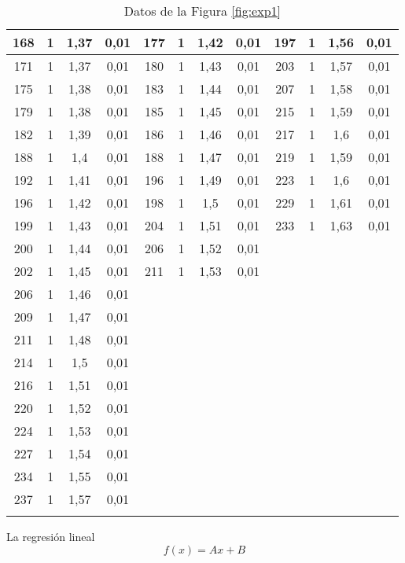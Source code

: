 \documentclass[a4paper,12pt,spanish]{article}
\begin{document}
\begin{longtable}{|*{12}{c|}}
		168 & 1 & 1,37 & 0,01 & 177 & 1 & 1,42 & 0,01 & 197 & 1 & 1,56 & 0,01 \\ \hline 
		171 & 1 & 1,37 & 0,01 & 180 & 1 & 1,43 & 0,01 & 203 & 1 & 1,57 & 0,01 \\ \hline 
		175 & 1 & 1,38 & 0,01 & 183 & 1 & 1,44 & 0,01 & 207 & 1 & 1,58 & 0,01 \\ \hline 
		179 & 1 & 1,38 & 0,01 & 185 & 1 & 1,45 & 0,01 & 215 & 1 & 1,59 & 0,01 \\ \hline 
		182 & 1 & 1,39 & 0,01 & 186 & 1 & 1,46 & 0,01 & 217 & 1 & 1,6 & 0,01 \\ \hline 
		188 & 1 & 1,4 & 0,01 & 188 & 1 & 1,47 & 0,01 & 219 & 1 & 1,59 & 0,01 \\ \hline 
		192 & 1 & 1,41 & 0,01 & 196 & 1 & 1,49 & 0,01 & 223 & 1 & 1,6 & 0,01 \\ \hline 
		196 & 1 & 1,42 & 0,01 & 198 & 1 & 1,5 & 0,01 & 229 & 1 & 1,61 & 0,01 \\ \hline 
		199 & 1 & 1,43 & 0,01 & 204 & 1 & 1,51 & 0,01 & 233 & 1 & 1,63 & 0,01 \\ \hline 
		200 & 1 & 1,44 & 0,01 & 206 & 1 & 1,52 & 0,01 &  &  &  &  \\ \hline 
		202 & 1 & 1,45 & 0,01 & 211 & 1 & 1,53 & 0,01 &  &  &  &  \\ \hline 
		206 & 1 & 1,46 & 0,01 &  &  &  &  &  &  &  &  \\ \hline 
		209 & 1 & 1,47 & 0,01 &  &  &  &  &  &  &  &  \\ \hline 
		211 & 1 & 1,48 & 0,01 &  &  &  &  &  &  &  &  \\ \hline 
		214 & 1 & 1,5 & 0,01 &  &  &  &  &  &  &  &  \\ \hline 
		216 & 1 & 1,51 & 0,01 &  &  &  &  &  &  &  &  \\ \hline 
		220 & 1 & 1,52 & 0,01 &  &  &  &  &  &  &  &  \\ \hline 
		224 & 1 & 1,53 & 0,01 &  &  &  &  &  &  &  &  \\ \hline 
		227 & 1 & 1,54 & 0,01 &  &  &  &  &  &  &  &  \\ \hline 
		234 & 1 & 1,55 & 0,01 &  &  &  &  &  &  &  &  \\ \hline 
		237 & 1 & 1,57 & 0,01 &  &  &  &  &  &  &  &  \\ \hline 
		\caption{Datos de la Figura \ref{fig:exp1}}
	\end{longtable} 
	
	
	
	
	
	
	La regresión lineal
	\[f(x) = Ax + B
	\]
	
\end{document}
